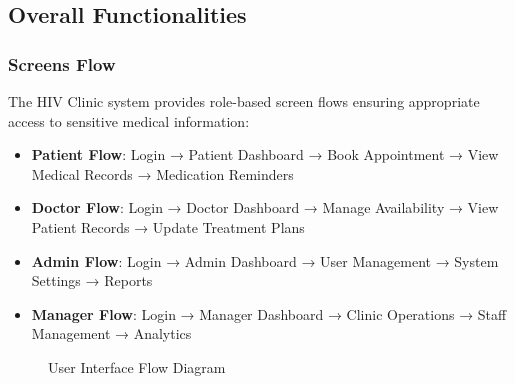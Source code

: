 \documentclass[12pt,a4paper]{article}
\begin{document}
\subsection{Overall Functionalities}

\subsubsection{Screens Flow}

The HIV Clinic system provides role-based screen flows ensuring appropriate access to sensitive medical information:

\begin{itemize}
    \item \textbf{Patient Flow}: Login → Patient Dashboard → Book Appointment → View Medical Records → Medication Reminders
    \item \textbf{Doctor Flow}: Login → Doctor Dashboard → Manage Availability → View Patient Records → Update Treatment Plans
    \item \textbf{Admin Flow}: Login → Admin Dashboard → User Management → System Settings → Reports
    \item \textbf{Manager Flow}: Login → Manager Dashboard → Clinic Operations → Staff Management → Analytics
\end{itemize}

\begin{figure}[H]
\centering
{}
\caption{User Interface Flow Diagram}
\label{fig:ui-flow-diagram}
\end{figure}
\end{document}
